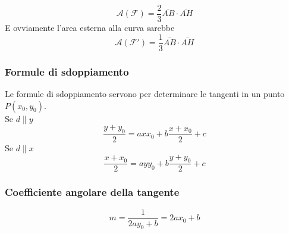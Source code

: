 \begin{equation*}
  \mathscr{A}(\mathscr{F}) = \frac{2}{3}\overline{AB}\cdot\overline{AH}
\end{equation*}
E ovviamente l'area esterna alla curva sarebbe
\begin{equation*}
  \mathscr{A}(\mathscr{F}') = \frac{1}{3}\overline{AB}\cdot\overline{AH}
\end{equation*}

\subsubsection{Formule di sdoppiamento}
Le formule di sdoppiamento servono per determinare le tangenti in un punto $P(x_0,y_0)$.\\
Se $d\|y$
\begin{equation*}
  \frac{y+y_0}{2}=axx_0+b\frac{x+x_0}{2}+c
\end{equation*}
Se $d\|x$
\begin{equation*}
  \frac{x+x_0}{2}=ayy_0+b\frac{y+y_0}{2}+c
\end{equation*}

\subsubsection{Coefficiente angolare della tangente}
\begin{equation*}
  m = \frac{1}{2ay_0+b} = 2ax_0+b
\end{equation*}

